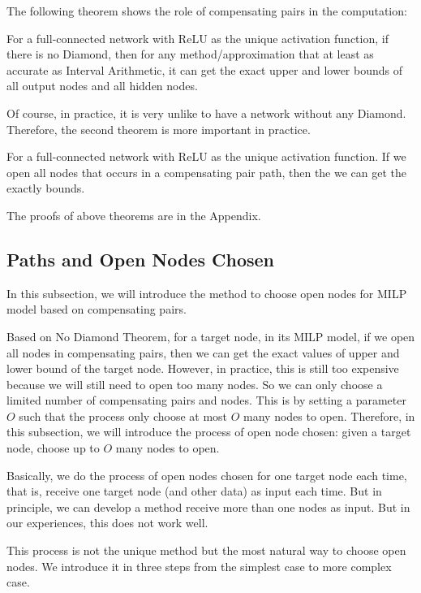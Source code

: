 \documentclass{llncs}
\newcommand{\ReLU}{\mathrm{ReLU}}
\begin{document}
The following theorem shows the role of compensating pairs in the computation:

\begin{theorem}
	For a full-connected network with $\ReLU$ as the unique activation function, if there is no Diamond, then for any method/approximation that at least as accurate as Interval Arithmetic, it can get the exact upper and lower bounds of all output nodes and all hidden nodes.
\end{theorem}

Of course, in practice, it is very unlike to have a network without any Diamond. Therefore, the second theorem is more important in practice.

\begin{theorem}
	For a full-connected network with $\ReLU$ as the unique activation function. If we open all nodes that occurs in a compensating pair path, then the we can get the exactly bounds.
\end{theorem}

The proofs of above theorems are in the Appendix.

\subsection{Paths and Open Nodes Chosen}

In this subsection, we will introduce the method to choose open nodes for MILP model based on compensating pairs.

Based on No Diamond Theorem, for a target node, in its MILP model, if we open all nodes in compensating pairs, then we can get the exact values of upper and lower bound of the target node. However, in practice, this is still too expensive because we will still need to open too many nodes. So we can only choose a limited number of compensating pairs and nodes. This is by setting a parameter $O$ such that the process only choose at most $O$ many nodes to open. Therefore, in this subsection, we will introduce the process of open node chosen: given a target node, choose up to $O$ many nodes to open.


Basically, we do the process of open nodes chosen for one target node each time, that is, receive one target node (and other data) as input each time. But in principle, we can develop a method receive more than one nodes as input. But in our experiences, this does not work well.  

This process is not the unique method but the most natural way to choose open nodes. We introduce it in three steps from the simplest case to more complex case.
\end{document}
